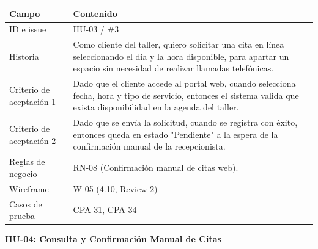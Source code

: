 {\def\LTcaptype{none} %
\begin{longtable}[]{@{}
  >{\raggedright\arraybackslash}p{}
  >{\raggedright\arraybackslash}p{}@{}}
\toprule\noalign{}
\begin{minipage}[b]{\linewidth}\raggedright
\textbf{Campo}
\end{minipage} & \begin{minipage}[b]{\linewidth}\raggedright
\textbf{Contenido}
\end{minipage} \\
\midrule\noalign{}
\endhead
\bottomrule\noalign{}
\endlastfoot
ID e issue & HU-03 / \#3 \\
Historia & Como cliente del taller, quiero solicitar una cita en línea
seleccionando el día y la hora disponible, para apartar un espacio sin
necesidad de realizar llamadas telefónicas. \\
Criterio de aceptación 1 & Dado que el cliente accede al portal web,
cuando selecciona fecha, hora y tipo de servicio, entonces el sistema
valida que exista disponibilidad en la agenda del taller. \\
Criterio de aceptación 2 & Dado que se envía la solicitud, cuando se
registra con éxito, entonces queda en estado "Pendiente" a la espera de
la confirmación manual de la recepcionista. \\
Reglas de negocio & RN-08 (Confirmación manual de citas web). \\
Wireframe & W-05 (4.10, Review 2) \\
Casos de prueba & CPA-31, CPA-34 \\
\end{longtable}
}

\textbf{HU-04: Consulta y Confirmación Manual de Citas}

